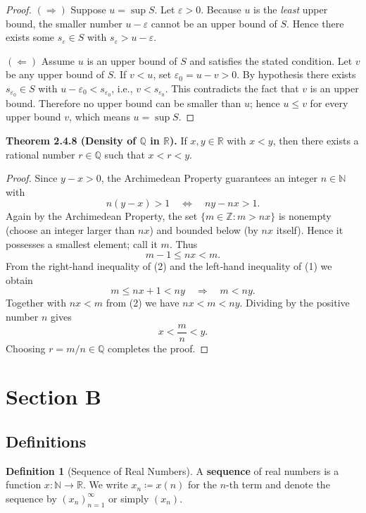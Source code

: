 \documentclass[12pt,a4paper]{article}
\theoremstyle{definition}
\newtheorem*{definition}{Definition}
\newcommand{\R}{\mathbb{R}}
\newcommand{\Q}{\mathbb{Q}}
\newcommand{\N}{\mathbb{N}}
\newcommand{\Z}{\mathbb{Z}}
\newcommand{\eps}{\varepsilon}
\begin{document}
\begin{proof}
\((\Rightarrow)\) Suppose \(u=\sup S\). Let \(\eps>0\). Because \(u\) is the \emph{least} upper bound, the smaller number \(u-\eps\) cannot be an upper bound of \(S\). Hence there exists some \(s_\eps\in S\) with \(s_\eps > u-\eps\).

\((\Leftarrow)\) Assume \(u\) is an upper bound of \(S\) and satisfies the stated condition. Let \(v\) be any upper bound of \(S\). If \(v<u\), set \(\eps_0 = u-v>0\). By hypothesis there exists \(s_{\eps_0}\in S\) with \(u-\eps_0 < s_{\eps_0}\), i.e., \(v < s_{\eps_0}\). This contradicts the fact that \(v\) is an upper bound. Therefore no upper bound can be smaller than \(u\); hence \(u\le v\) for every upper bound \(v\), which means \(u=\sup S\).
\end{proof}

\textbf{Theorem 2.4.8 (Density of \(\Q\) in \(\R\)).} If \(x,y\in\R\) with \(x<y\), then there exists a rational number \(r\in\Q\) such that \(x<r<y\).

\begin{proof}
Since \(y-x>0\), the Archimedean Property guarantees an integer \(n\in\N\) with
\[
n(y-x) > 1 \quad\Longleftrightarrow\quad ny - nx > 1. \tag{1}
\]
Again by the Archimedean Property, the set \(\{m\in\Z : m > nx\}\) is nonempty (choose an integer larger than \(nx\)) and bounded below (by \(nx\) itself). Hence it possesses a smallest element; call it \(m\). Thus
\[
m-1 \le nx < m. \tag{2}
\]
From the right‑hand inequality of (2) and the left‑hand inequality of (1) we obtain
\[
m \le nx+1 < ny \quad\Longrightarrow\quad m < ny.
\]
Together with \(nx < m\) from (2) we have \(nx < m < ny\). Dividing by the positive number \(n\) gives
\[
x < \frac{m}{n} < y.
\]
Choosing \(r = m/n\in\Q\) completes the proof.
\end{proof}

\newpage
\section{Section B}

\subsection{Definitions}

\begin{definition}[Sequence of Real Numbers]
A \textbf{sequence} of real numbers is a function \(x:\N\to\R\). We write \(x_n\coloneqq x(n)\) for the \(n\)-th term and denote the sequence by \((x_n)_{n=1}^\infty\) or simply \((x_n)\).
\end{definition}
\end{document}
